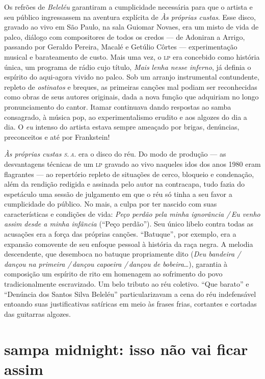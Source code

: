 Os refrões de \textit{Beleléu} garantiram a cumplicidade necessária para que o
artista e seu público ingressassem na aventura explícita de \textit{Às próprias
custas}. Esse disco, gravado ao vivo em São Paulo, na sala Guiomar
Novaes, era um misto de vida de palco, diálogo com compositores de todos
os credos --- de Adoniran a Arrigo, passando por Geraldo Pereira, Macalé e
Getúlio Côrtes --- experimentação musical e barateamento de custo. Mais
uma vez, o \textsc{lp} era concebido como história única, um programa de rádio
cujo título, \textit{Mais lenha nesse inferno}, já definia o espírito do
aqui-agora vivido no palco. Sob um arranjo instrumental contundente,
repleto de \textit{ostinatos} e breques, as primeiras canções mal podiam ser
reconhecidas como obras de seus autores originais, dada a nova função
que adquiriam no longo pronunciamento do cantor. Itamar continuava
dando respostas ao samba consagrado, à música pop, ao experimentalismo
erudito e aos algozes do dia a dia. O \textit{eu} intenso do artista estava
sempre ameaçado por brigas, denúncias, preconceitos e até por
Frankstein!

\textit{Às próprias custas \textsc{s.\,a.}} era o disco do réu. Do modo de produção --- as
desvantagens técnicas de um \textsc{lp} gravado ao vivo naqueles idos dos anos
1980 eram flagrantes --- ao repertório repleto de situações de cerco,
bloqueio e condenação, além da rendição redigida e assinada pelo autor
na contracapa, tudo fazia do espetáculo uma sessão de julgamento em que
o réu só tinha a seu favor a cumplicidade do público. No mais, a culpa
por ter nascido com suas características e condições de vida: \textit{Peço
perdão pela minha ignorância /\,Eu venho assim desde a minha infância}
(``Peço perdão''). Seu único libelo contra todas as acusações era a força
das próprias canções. ``Batuque'', por exemplo, era a expansão comovente de
seu enfoque pessoal à história da raça negra. A melodia descendente, que
desemboca no batuque propriamente dito (\textit{Deu bandeira /\,dançou na
primeira /\,dançou capoeira /\,dançou de bobeira}\ldots), garantia à
composição um espírito de rito em homenagem ao sofrimento do povo
tradicionalmente escravizado. Um belo tributo ao réu coletivo. ``Que
barato'' e ``Denúncia dos Santos Silva Beleléu'' particularizavam a cena do
réu indefensável entoando suas justificativas satíricas em meio às
frases frias, cortantes e cortadas das guitarras algozes.

\section{sampa midnight: isso não vai ficar assim}

